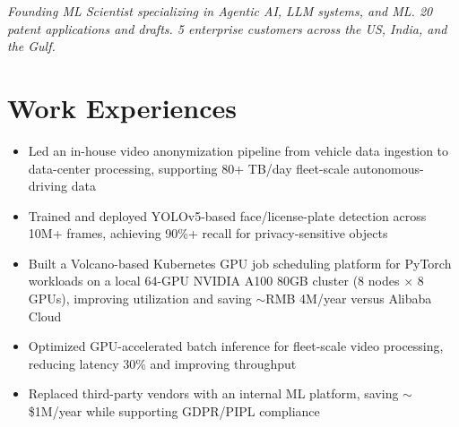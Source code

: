 \documentclass[10pt,a4paper,roman]{moderncv} %
\begin{document}
\makecvtitle
\vspace{-2em}
\begin{center}
\textit{Founding ML Scientist specializing in Agentic AI, LLM systems, and ML. 20 patent applications and drafts. 5 enterprise customers across the US, India, and the Gulf.}
\end{center}


\section{Work Experiences}
{
\begin{itemize}
\item Led an in-house video anonymization pipeline from vehicle data ingestion to data-center processing, supporting 80+ TB/day fleet-scale autonomous-driving data
\item Trained and deployed YOLOv5-based face/license-plate detection across 10M+ frames, achieving 90\%+ recall for privacy-sensitive objects
\item Built a Volcano-based Kubernetes GPU job scheduling platform for PyTorch workloads on a local 64-GPU NVIDIA A100 80GB cluster (8 nodes $\times$ 8 GPUs), improving utilization and saving $\sim$RMB 4M/year versus Alibaba Cloud
\item Optimized GPU-accelerated batch inference for fleet-scale video processing, reducing latency 30\% and improving throughput
\item Replaced third-party vendors with an internal ML platform, saving $\sim$\$1M/year while supporting GDPR/PIPL compliance
\end{itemize}
}
\end{document}
